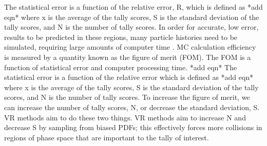 The statistical error is a function of the relative error, R, which is defined as
*add eqn* 
where x is the average of the tally scores, S is the standard
deviation of the tally scores, and N is the number of tally scores.  
In order for
accurate, low error, results to be predicted in these regions, many particle
histories need to be simulated, requiring large amounts of computer time
\cite{haghighat_wagner_2003}.
MC calculation efficiency is measured by a quantity known as the figure of merit
(FOM).  The FOM is a function of statistical error and computer processing time.
*add eqn*
The statistical error is a function of the relative error which is defined as
*add eqn* where x is the average of the tally scores, S is the standard
deviation of the tally scores, and N is the number of tally scores.  
To increase
the figure of merit, we can increase the number of tally scores, N, or decrease
the standard deviation, S. VR methods aim to do these two things.  VR methods
aim to increase N and decrease S by sampling from biased PDFs; this effectively
forces more collisions in regions of phase space that are
important to the tally of interest. 
